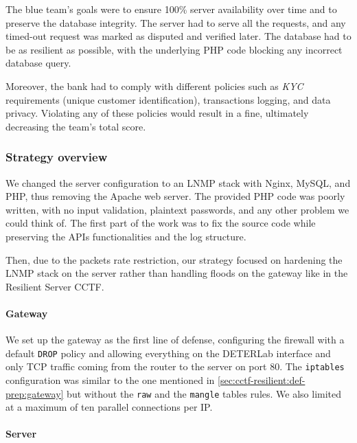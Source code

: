 The blue team's goals were to ensure 100\% server availability over time and to preserve the database integrity. 
The server had to serve all the requests, and any timed-out request was marked as disputed and verified later. 
The database had to be as resilient as possible, with the underlying PHP code blocking any incorrect database query.

Moreover, the bank had to comply with different policies such as \textit{KYC} requirements (unique customer identification), transactions logging, and data privacy. Violating any of these policies would result in a fine, ultimately decreasing the team's total score.

\subsubsection{Strategy overview}
\label{sec:cctf-secure:def-prep:strat-out}

We changed the server configuration to an LNMP stack with Nginx, MySQL, and PHP, thus removing the Apache web server.
The provided PHP code was poorly written, with no input validation, plaintext passwords, and any other problem we could think of.
The first part of the work was to fix the source code while preserving the APIs functionalities and the log structure.

Then, due to the packets rate restriction, our strategy focused on hardening the LNMP stack on the server rather than handling floods on the gateway like in the Resilient Server CCTF.

\paragraph{Gateway}
\label{sec:cctf-secure:def-prep:gateway}

We set up the gateway as the first line of defense, configuring the firewall with a default \texttt{DROP} policy and allowing everything on the DETERLab interface and only TCP traffic coming from the router to the server on port 80. The \texttt{iptables} configuration was similar to the one mentioned in \autoref{sec:cctf-resilient:def-prep:gateway} but without the \texttt{raw} and the \texttt{mangle} tables rules.
We also limited at a maximum of ten parallel connections per IP.

\paragraph{Server}
\label{sec:cctf-secure:def-prep:server}

